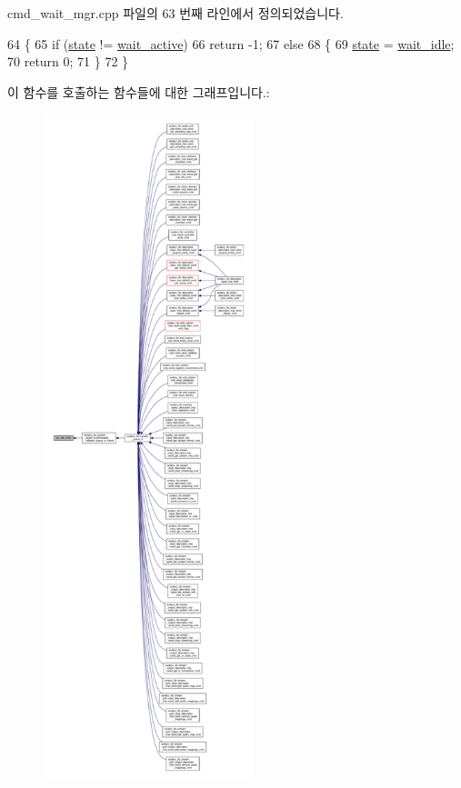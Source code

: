 cmd\+\_\+wait\+\_\+mgr.\+cpp 파일의 63 번째 라인에서 정의되었습니다.


\begin{DoxyCode}
64 \{
65     \textcolor{keywordflow}{if} (\hyperlink{classavdecc__lib_1_1cmd__wait__mgr_a95d6840dec33a00d29915754985b0e94}{state} != \hyperlink{classavdecc__lib_1_1cmd__wait__mgr_a6d8ed97126bdf056391a14a921f643a8a3a49c08b68d3f5e1f225f25de33bfa43}{wait\_active})
66         \textcolor{keywordflow}{return} -1;
67     \textcolor{keywordflow}{else}
68     \{
69         \hyperlink{classavdecc__lib_1_1cmd__wait__mgr_a95d6840dec33a00d29915754985b0e94}{state} = \hyperlink{classavdecc__lib_1_1cmd__wait__mgr_a6d8ed97126bdf056391a14a921f643a8af918dc315c26116ff99848114dc18358}{wait\_idle};
70         \textcolor{keywordflow}{return} 0;
71     \}
72 \}
\end{DoxyCode}


이 함수를 호출하는 함수들에 대한 그래프입니다.\+:
\nopagebreak
\begin{figure}[H]
\begin{center}
\leavevmode
\includegraphics[height=550pt]{classavdecc__lib_1_1cmd__wait__mgr_a0d5ac08693ab386df80fa285e356e4b4_icgraph}
\end{center}
\end{figure}


